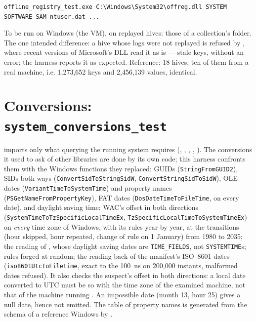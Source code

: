 \documentclass[11pt,a4paper,oneside]{report}
\begin{document}
\begin{lstlisting}
offline_registry_test.exe C:\Windows\System32\offreg.dll SYSTEM SOFTWARE SAM ntuser.dat ...
\end{lstlisting}

To be run on Windows (the VM), on replayed hives: those of a collection's
 folder. The one intended difference: a hive whose logs were
not replayed is refused by \wac{}, where recent versions of Microsoft's DLL
read it as is — stale keys, without an error; the harness reports it as
expected. Reference: 18 hives, ten of them from a real machine, i.e. 1,273,652
keys and 2,456,139 values, identical.

\section{Conversions: \texttt{system\_conversions\_test}}

\wac{} imports only what querying the running system requires
(, , , ,
). The conversions it used to ask of other libraries are
done by its own code; this harness confronts them with the Windows functions
they replaced: GUIDs (\texttt{StringFromGUID2}), SIDs both ways
(\texttt{ConvertSidToStringSidW}, \texttt{ConvertStringSidToSidW}), OLE dates
(\texttt{VariantTimeToSystemTime}) and property names
(\texttt{PSGetNameFromPropertyKey}), FAT dates (\texttt{DosDateTimeToFileTime},
on every date), and daylight saving time: WAC's offset in both directions
(\texttt{SystemTimeToTzSpecificLocalTimeEx}, \texttt{TzSpecificLocalTimeToSystemTimeEx})
on \emph{every} time zone of Windows, with its rules year by year, at the
transitions (hour skipped, hour repeated, change of rule on 1 January) from
1980 to 2035; the reading of , whose daylight saving dates are \texttt{TIME\_FIELDS},
not \texttt{SYSTEMTIME}s; rules forged at random; the reading back of the
manifest's ISO~8601 dates (\texttt{iso8601UtcToFiletime}, exact to the 100~ns on
200,000 instants, malformed dates refused). It also checks the
suspect's offset in both directions: a local
date converted to UTC must be so with the time zone of the examined machine,
not that of the machine running \wac{}. An impossible date (month 13, hour 25)
gives a null date, hence not emitted. The table of property names is generated
from the schema of a reference Windows by .
\end{document}
